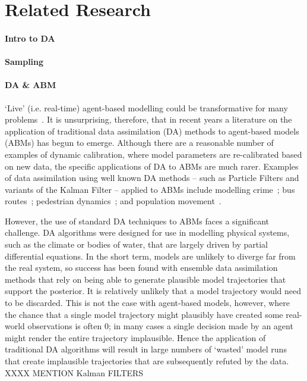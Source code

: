 \section{Related Research}\label{sec:background}

\paragraph{Intro to DA}


\paragraph{Sampling}


\paragraph{DA \& ABM}

`Live' (i.e. real-time) agent-based modelling could be transformative for many problems~\cite{swarup_live_2020}. It is unsurprising, therefore, that in recent years a literature on the application of traditional data assimilation (DA) methods to agent-based models (ABMs) has begun to emerge. Although there are a reasonable number of examples of dynamic calibration, where model parameters are re-calibrated based on new data, the specific applications of DA to ABMs are much rarer. Examples of data assimilation using well known DA methods -- such as Particle Filters and variants of the Kalman Filter -- applied to ABMs include modelling
crime~\cite{lloyd_exploring_2016};
bus routes~\cite{kieu_dealing_2020};
pedestrian dynamics~\cite{wang_data_2015, ward_dynamic_2016, clay_realtime_2020, malleson_simulating_2020};
and population movement~\cite{lueck_who_2019}. 

However, the use of standard DA techniques to ABMs faces a significant challenge. DA algorithms were designed for use in modelling physical systems, such as the climate or bodies of water, that are largely driven by partial differential equations. In the short term, models are unlikely to diverge far from the real system, so success has been found with ensemble data assimilation methods that rely on being able to generate plausible model trajectories that support the posterior. It is relatively unlikely that a model trajectory would need to be discarded.
This is not the case with agent-based models, however, where the chance that a single model trajectory might plausibly have created some real-world observations is often 0; in many cases a single decision made by an agent might render the entire trajectory implausible. Hence the application of traditional DA algorithms will result in large numbers of `wasted' model runs that create implausible trajectories that are subsequently refuted by the data.
XXXX MENTION Kalman FILTERS 


